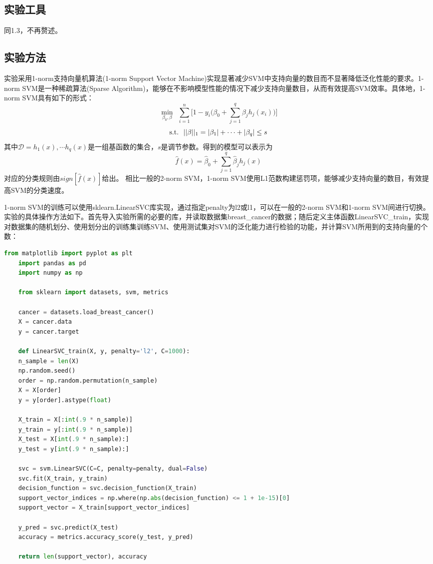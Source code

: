 \documentclass[12pt]{article}
\begin{document}
\subsection{实验工具}
同1.3，不再赘述。
\vbox{}
\subsection{实验方法}
实验采用1-norm支持向量机算法(1-norm Support Vector Machine)实现显著减少SVM中支持向量的数目而不显著降低泛化性能的要求。1-norm SVM是一种稀疏算法(Sparse Algorithm)，能够在不影响模型性能的情况下减少支持向量数目，从而有效提高SVM效率\citealp{jung2013support}。具体地，1-norm SVM具有如下的形式\citealp{zhu20031}：
$$
\min\limits_{\beta_{0}, \beta} \ \ \sum_{i=1}^{n}\Big[1-y_{i}\Big(\beta_{0}+\sum_{j=1}^{q}\beta_{j}h_{j}(x_{i})\Big)\Big]
$$
$$
{\rm s.t.} \ \ ||\beta||_{1}=|\beta_{1}|+\cdots+|\beta_{q}|\leq s
$$
其中$\mathcal{D}={h_{1}(x),\cdots h_{q}(x)}$是一组基函数的集合，$s$是调节参数。得到的模型可以表示为
$$
\hat{f}(x)=\hat{\beta}_{0}+\sum_{j=1}^{q}\hat{\beta}_{j}h_{j}(x)
$$
对应的分类规则由$sign[\hat{f}(x)]$给出。
相比一般的2-norm SVM，1-norm SVM使用L1范数构建惩罚项，能够减少支持向量的数目，有效提高SVM的分类速度。\par 
1-norm SVM的训练可以使用sklearn.LinearSVC库实现，通过指定penalty为l2或l1，可以在一般的2-norm SVM和1-norm SVM间进行切换。实验的具体操作方法如下。首先导入实验所需的必要的库，并读取数据集breast\_cancer的数据；随后定义主体函数LinearSVC\_train，实现对数据集的随机划分、使用划分出的训练集训练SVM、使用测试集对SVM的泛化能力进行检验的功能，并计算SVM所用到的支持向量的个数：
\\
\begin{lstlisting}[language=python]
	from matplotlib import pyplot as plt
	import pandas as pd
	import numpy as np
	
	from sklearn import datasets, svm, metrics
	
	cancer = datasets.load_breast_cancer()
	X = cancer.data
	y = cancer.target
	
	def LinearSVC_train(X, y, penalty='l2', C=1000):
	n_sample = len(X)
	np.random.seed()
	order = np.random.permutation(n_sample)
	X = X[order]
	y = y[order].astype(float)
	
	X_train = X[:int(.9 * n_sample)]
	y_train = y[:int(.9 * n_sample)]
	X_test = X[int(.9 * n_sample):]
	y_test = y[int(.9 * n_sample):]
	
	svc = svm.LinearSVC(C=C, penalty=penalty, dual=False)
	svc.fit(X_train, y_train)
	decision_function = svc.decision_function(X_train)
	support_vector_indices = np.where(np.abs(decision_function) <= 1 + 1e-15)[0]
	support_vector = X_train[support_vector_indices]
	
	y_pred = svc.predict(X_test)
	accuracy = metrics.accuracy_score(y_test, y_pred)
	
	return len(support_vector), accuracy
 \end{lstlisting}
\end{document}
